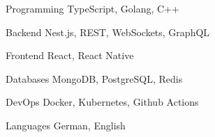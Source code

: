 

\begin{cvskills}

  \cvskill
    {Programming} %
    {TypeScript, Golang, C++} %

  \cvskill
    {Backend} %
    {Nest.js, REST, WebSockets, GraphQL} %

  \cvskill
    {Frontend} %
    {React, React Native} %

  \cvskill
    {Databases} %
    {MongoDB, PostgreSQL, Redis} %

  \cvskill
    {DevOps} %
    {Docker, Kubernetes, Github Actions} %

  \cvskill
    {Languages} %
    {German, English} %

\end{cvskills}
